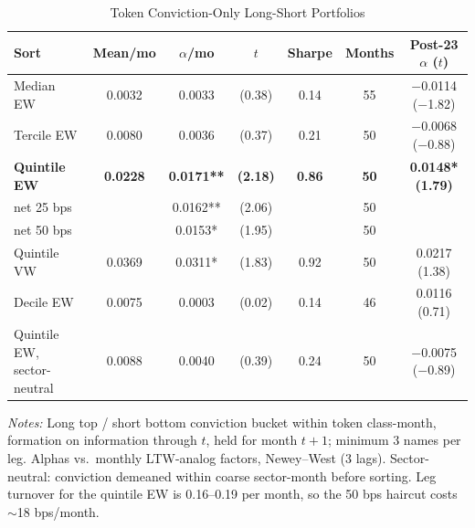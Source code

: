 \documentclass[12pt]{article}
\begin{document}
\begin{table}[ht]
\centering
\caption{Token Conviction-Only Long-Short Portfolios}
\label{tab:quintile}
\small
\begin{tabular}{lcccccc}
\toprule
Sort & Mean/mo & $\alpha$/mo & $t$ & Sharpe & Months & Post-23 $\alpha$ ($t$) \\
\midrule
Median EW & 0.0032 & 0.0033 & (0.38) & 0.14 & 55 & $-$0.0114 ($-$1.82) \\
Tercile EW & 0.0080 & 0.0036 & (0.37) & 0.21 & 50 & $-$0.0068 ($-$0.88) \\
\textbf{Quintile EW} & \textbf{0.0228} & \textbf{0.0171**} & \textbf{(2.18)} & \textbf{0.86} & \textbf{50} & \textbf{0.0148* (1.79)} \\
\quad net 25 bps & & 0.0162** & (2.06) & & 50 & \\
\quad net 50 bps & & 0.0153* & (1.95) & & 50 & \\
Quintile VW & 0.0369 & 0.0311* & (1.83) & 0.92 & 50 & 0.0217 (1.38) \\
Decile EW & 0.0075 & 0.0003 & (0.02) & 0.14 & 46 & 0.0116 (0.71) \\
Quintile EW, sector-neutral & 0.0088 & 0.0040 & (0.39) & 0.24 & 50 & $-$0.0075 ($-$0.89) \\
\bottomrule
\end{tabular}
\smallskip

\parbox{0.92\linewidth}{\footnotesize
\textit{Notes:} Long top / short bottom conviction bucket within token class-month,
formation on information through $t$, held for month $t{+}1$; minimum 3 names per leg.
Alphas vs.\ monthly LTW-analog factors, Newey--West (3 lags). Sector-neutral: conviction
demeaned within coarse sector-month before sorting. Leg turnover for the quintile EW is
0.16--0.19 per month, so the 50 bps haircut costs $\sim$18 bps/month.}
\end{table}
\end{document}
